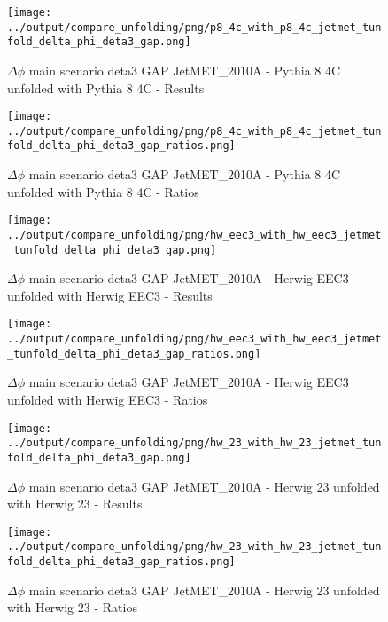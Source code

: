 \documentclass[11pt]{book}
\begin{document}
\begin{figure}[ht]
\centering
\texttt{[image: ../output/compare\_unfolding/png/p8\_4c\_with\_p8\_4c\_jetmet\_tunfold\_delta\_phi\_deta3\_gap.png]}
\caption{$\Delta\phi$ main scenario deta3 GAP JetMET\_2010A - Pythia 8 4C unfolded with Pythia 8 4C - Results}
\label{p8_p8_jetmet_tunfold_delta_phi_deta3_gap_a}
\end{figure}

\begin{figure}[ht]
\centering
\texttt{[image: ../output/compare\_unfolding/png/p8\_4c\_with\_p8\_4c\_jetmet\_tunfold\_delta\_phi\_deta3\_gap\_ratios.png]}
\caption{$\Delta\phi$ main scenario deta3 GAP JetMET\_2010A - Pythia 8 4C unfolded with Pythia 8 4C - Ratios}
\label{p8_p8_jetmet_tunfold_delta_phi_deta3_gap_b}
\end{figure}

\begin{figure}[ht]
\centering
\texttt{[image: ../output/compare\_unfolding/png/hw\_eec3\_with\_hw\_eec3\_jetmet\_tunfold\_delta\_phi\_deta3\_gap.png]}
\caption{$\Delta\phi$ main scenario deta3 GAP JetMET\_2010A - Herwig EEC3 unfolded with Herwig EEC3 - Results}
\label{hw_eec3_hw_eec3_jetmet_tunfold_delta_phi_deta3_gap_a}
\end{figure}

\begin{figure}[ht]
\centering
\texttt{[image: ../output/compare\_unfolding/png/hw\_eec3\_with\_hw\_eec3\_jetmet\_tunfold\_delta\_phi\_deta3\_gap\_ratios.png]}
\caption{$\Delta\phi$ main scenario deta3 GAP JetMET\_2010A - Herwig EEC3 unfolded with Herwig EEC3 - Ratios}
\label{hw_eec3_hw_eec3_jetmet_tunfold_delta_phi_deta3_gap_b}
\end{figure}

\begin{figure}[ht]
\centering
\texttt{[image: ../output/compare\_unfolding/png/hw\_23\_with\_hw\_23\_jetmet\_tunfold\_delta\_phi\_deta3\_gap.png]}
\caption{$\Delta\phi$ main scenario deta3 GAP JetMET\_2010A - Herwig 23 unfolded with Herwig 23 - Results}
\label{hw_23_hw_23_jetmet_tunfold_delta_phi_deta3_gap_a}
\end{figure}

\begin{figure}[ht]
\centering
\texttt{[image: ../output/compare\_unfolding/png/hw\_23\_with\_hw\_23\_jetmet\_tunfold\_delta\_phi\_deta3\_gap\_ratios.png]}
\caption{$\Delta\phi$ main scenario deta3 GAP JetMET\_2010A - Herwig 23 unfolded with Herwig 23 - Ratios}
\label{hw_23_hw_23_jetmet_tunfold_delta_phi_deta3_gap_b}
\end{figure}
\end{document}
